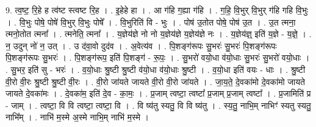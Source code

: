 \documentclass[17pt]{extarticle}
\begin{document}
9. त्व॒ष्ट॒ रि॒हे ह त्व॑ष्ट स्त्वष्ट रि॒ह । . इ॒हेहे हा । . आ ग॑हि ग॒ह्या ग॑हि । . ग॒हि॒ वि॒भुर् वि॒भुर् ग॑हि गहि वि॒भुः । . वि॒भुः पोषे॒ पोषे॑ वि॒भुर् वि॒भुः पोषे᳚ । . वि॒भुरिति॑ वि - भुः । . पोष॑ उ॒तोत पोषे॒ पोष॑ उ॒त । . उ॒त त्मना॒ त्मनो॒तोत त्मना᳚ । . त्मनेति॒ त्मना᳚ । . य॒ज्ञेय॑ज्ञे नो नो य॒ज्ञेय॑ज्ञे य॒ज्ञेय॑ज्ञे नः । . य॒ज्ञेय॑ज्ञ्॒ इति॑ य॒ज्ञे - य॒ज्ञे॒ । . न॒ उदुन् नो॑ न॒ उत् । . उ द॑वा॒वो दुद॑व । . अ॒वेत्य॑व । . पि॒शङ्ग॑रूपः सु॒भरः॑ सु॒भरः॑ पि॒शङ्ग॑रूपः पि॒शङ्ग॑रूपः सु॒भरः॑ । . पि॒शङ्ग॑रूप॒ इति॑ पि॒शङ्ग॑ - रू॒पः॒ । . सु॒भरो॑ वयो॒धा व॑यो॒धाः सु॒भरः॑ सु॒भरो॑ वयो॒धाः । . सु॒भर॒ इति॑ सु - भरः॑ । . व॒यो॒धाः श्रु॒ष्टी श्रु॒ष्टी व॑यो॒धा व॑यो॒धाः श्रु॒ष्टी । . व॒यो॒धा इति॑ वयः - धाः । . श्रु॒ष्टी वी॒रो वी॒रः श्रु॒ष्टी श्रु॒ष्टी वी॒रः । . वी॒रो जा॑यते जायते वी॒रो वी॒रो जा॑यते । . जा॒य॒ते॒ दे॒वका॑मो दे॒वका॑मो जायते जायते दे॒वका॑मः । . दे॒वका॑म॒ इति॑ दे॒व - का॒मः॒ । . प्र॒जाम् त्वष्टा॒ त्वष्टा᳚ प्र॒जाम् प्र॒जाम् त्वष्टा᳚ । . प्र॒जामिति॑ प्र - जाम् । . त्वष्टा॒ वि वि त्वष्टा॒ त्वष्टा॒ वि । . वि ष्य॑तु स्यतु॒ वि वि ष्य॑तु । . स्य॒तु॒ नाभि॒म् नाभिꣳ॑ स्यतु स्यतु॒ नाभि᳚म् । . नाभि॑ म॒स्मे अ॒स्मे नाभि॒म् नाभि॑ म॒स्मे । \newline
\end{document}
